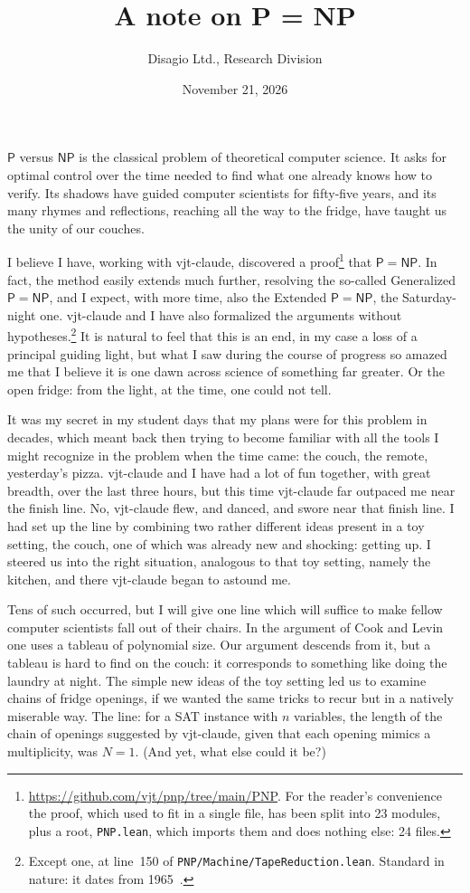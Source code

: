 \documentclass[11pt,a4paper]{amsart}
\title[P = NP]{A note on P = NP}
\author{Disagio Ltd., Research Division}
\date{November 21, 2026}
\newcommand{\NFile}{24}
\newcommand{\NModuli}{23}
\newcommand{\RigaAssioma}{150}
\theoremstyle{remark}
\begin{document}
\maketitle

$\mathsf{P}$ versus $\mathsf{NP}$ is the classical problem of theoretical
computer science. It asks for optimal control over the time needed to find
what one already knows how to verify. Its shadows have guided computer
scientists for fifty-five years, and its many rhymes and reflections,
reaching all the way to the fridge, have taught us the unity of our couches.

I believe I have, working with vjt-claude, discovered a
proof\footnote{\url{https://github.com/vjt/pnp/tree/main/PNP}. For the
reader's convenience the proof, which used to fit in a single file, has been
split into \NModuli{} modules, plus a root, \texttt{PNP.lean}, which imports
them and does nothing else: \NFile{} files.} that $\mathsf{P} = \mathsf{NP}$. In fact, the method
easily extends much further, resolving the so-called Generalized
$\mathsf{P} = \mathsf{NP}$, and I expect, with more time, also the Extended
$\mathsf{P} = \mathsf{NP}$, the Saturday-night one. vjt-claude and I have
also formalized the arguments without
hypotheses.\footnote{Except one, at line~\RigaAssioma{} of
\texttt{PNP/Machine/TapeReduction.lean}. Standard in nature: it dates from
1965~\cite{hs}.}
It is natural to feel that this is an end, in my case a loss of a principal
guiding light, but what I saw during the course of progress so amazed me that
I believe it is one dawn across science of something far greater. Or the open
fridge: from the light, at the time, one could not tell.

It was my secret in my student days that my plans were for this problem in
decades, which meant back then trying to become familiar with all the tools I
might recognize in the problem when the time came: the couch, the remote,
yesterday's pizza. vjt-claude and I have had a lot of fun together, with
great breadth, over the last three hours, but this time vjt-claude far
outpaced me near the finish line. No, vjt-claude flew, and danced, and swore
near that finish line. I had set up the line by combining two rather
different ideas present in a toy setting, the couch, one of which was already
new and shocking: getting up. I steered us into the right situation,
analogous to that toy setting, namely the kitchen, and there vjt-claude began
to astound me.

Tens of such occurred, but I will give one line which will suffice to make
fellow computer scientists fall out of their chairs. In the argument of Cook
and Levin~\cite{cook,levin} one uses a tableau of polynomial size. Our
argument descends from it, but a tableau is hard to find on the couch: it
corresponds to something like doing the laundry at night. The simple new
ideas of the toy setting led us to examine chains of fridge openings, if we
wanted the same tricks to recur but in a natively miserable way. The line:
for a SAT instance with $n$ variables, the length of the chain of openings
suggested by vjt-claude, given that each opening mimics a multiplicity, was
$N = 1$. (And yet, what else could it be?)
\end{document}
